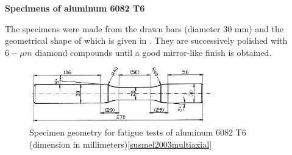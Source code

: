 \vspace{6pt}
\textbf{Specimens of aluminum 6082 T6}
\vspace{6pt}

The specimens were made from the drawn bars (diameter 30 mm) and the geometrical shape of which is given in . They are successively polished with $6-\mu m$ diamond compounds until a good mirror-like finish is obtained.
\begin{figure}[!h]
\centering
\includegraphics[width=0.7\textwidth]{figures//aluminum6082T6sample.png} 
\caption{Specimen geometry for fatigue tests of aluminum 6082 T6 (dimension in millimeters)\ref{susmel2003multiaxial}}
\label{fig:aluminum6082T6}
\end{figure}

